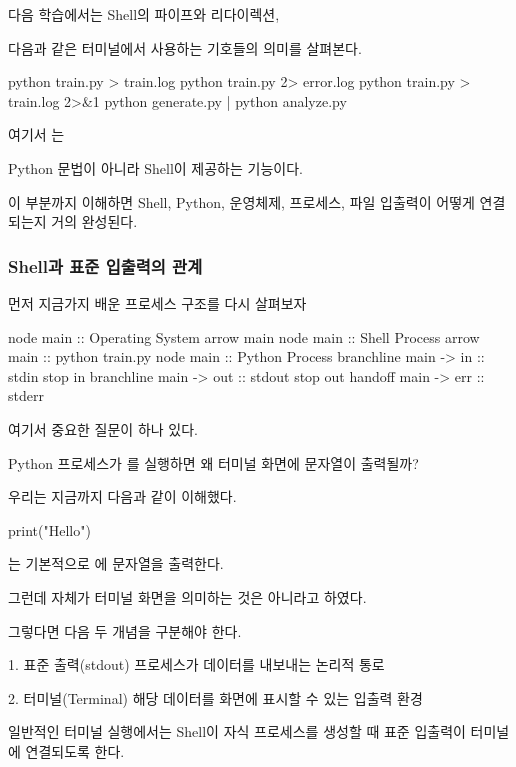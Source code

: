다음 학습에서는 Shell의 파이프와 리다이렉션,

다음과 같은 터미널에서 사용하는 기호들의 의미를 살펴본다.

\begin{dhkzsh}
python train.py > train.log
python train.py 2> error.log
python train.py > train.log 2>&1
python generate.py | python analyze.py
\end{dhkzsh}

여기서 는 

Python 문법이 아니라 Shell이 제공하는 기능이다.

이 부분까지 이해하면 Shell, Python, 운영체제, 프로세스, 파일 입출력이 어떻게 연결되는지 거의 완성된다.

\subsubsection{Shell과 표준 입출력의 관계}

먼저 지금가지 배운 프로세스 구조를 다시 살펴보자

\begin{dhkbranch}[in=8]
node main :: Operating System
arrow main
node main :: Shell Process
arrow main :: python train.py
node main :: Python Process
branchline main -> in :: stdin
stop in
branchline main -> out :: stdout
stop out
handoff main -> err :: stderr
\end{dhkbranch}

여기서 중요한 질문이 하나 있다.

Python 프로세스가 를 실행하면 왜 터미널 화면에 문자열이 출력될까?

우리는 지금까지 다음과 같이 이해했다.

\begin{dhkcode}
print("Hello")
\end{dhkcode}

는 기본적으로 에 문자열을 출력한다.

그런데  자체가 터미널 화면을 의미하는 것은 아니라고 하였다.

그렇다면 다음 두 개념을 구분해야 한다.

\begin{dhksmry}
    1. 표준 출력(stdout)
        프로세스가 데이터를 내보내는 논리적 통로

    2. 터미널(Terminal)
        해당 데이터를 화면에 표시할 수 있는 입출력 환경
\end{dhksmry}

일반적인 터미널 실행에서는 Shell이 자식 프로세스를 생성할 때 표준 입출력이 터미널에 연결되도록 한다.

